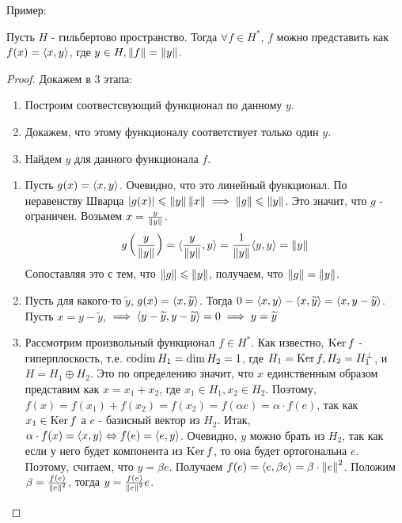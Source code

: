Пример: \todo

\begin{theorem}
	Пусть $H$ - гильбертово пространство. Тогда $\forall f \in H^*$, $f$ можно представить как $f(x) = \langle x , y\rangle$, где $y \in H, \left\|f\right\| = \left\|y\right\|$.
\end{theorem}
\begin{proof}
	Докажем в 3 этапа:
	\begin{enumerate}
		\item Построим соотвестсвующий функционал по данному $y$.
		\item Докажем, что этому функционалу соответствует только один $y$.
		\item Найдем $y$ для данного функционала $f$.
	\end{enumerate}
	\begin{enumerate}[leftmargin=*]
	\item
	Пусть $g(x) = \langle x , y\rangle$. Очевидно, что это линейный функционал. 
	По неравенству Шварца $\left|g(x)\right| \leqslant \left\|y\right\| \left\|x\right\| \implies \left\|g\right\| \leqslant \left\|y\right\|$. Это значит, что $g$ - ограничен.
	Возьмем $x = \frac{y}{\left\|y\right\|}$. 
	\begin{gather*}
		g\left(\frac{y}{\left\|y\right\|}\right) = \langle \frac{y}{\left\|y\right\|} , y\rangle = \frac{1}{\left\|y\right\|}\langle y , y\rangle = \left\|y\right\|
	\end{gather*}
	Сопоставляя это с тем, что $\left\|g\right\| \leqslant \left\|y\right\|$, получаем, что $\left\|g\right\| = \left\|y\right\|$.
	\item
	Пусть для какого-то $\widetilde{y}$, $g(x) = \langle x , \widetilde{y}\rangle$.
	Тогда $0 = \langle x , y\rangle - \langle x , \widetilde{y}\rangle = \langle x , y - \widetilde{y}\rangle$. Пусть $x = y - \widetilde{y}$,  
	$\implies \langle y - \widetilde{y} , y - \widetilde{y}\rangle = 0 \implies y = \widetilde{y}$
	\item
	Рассмотрим произвольный функционал $f \in H^*$. Как известно, $\operatorname{Ker} f$ - гиперплоскость, т.е. 
	$\operatorname{codim} H_1 = \dim H_2 = 1$, где $H_1 = \operatorname{Ker} f, H_2 = H_1^\bot$, и $H = H_1 \oplus H_2$.
	Это по определению значит, что $x$ единственным образом представим как $x = x_1 + x_2$, где $x_1 \in H_1, x_2 \in H_2$.
	Поэтому, $f(x) = f(x_1) + f(x_2) = f(x_2) = f(\alpha e) = \alpha \cdot f(e)$, так как $x_1 \in \operatorname{Ker} f$ а $e$ - базисный вектор из $H_2$.
	Итак, $\alpha \cdot f(x) = \langle x , y\rangle \Leftrightarrow f(e) = \langle e , y\rangle$. 
	Очевидно, $y$ можно брать из $H_2$, так как если у него будет компонента из $\operatorname{Ker} f$, то она будет ортогональна $e$. 
	Поэтому, считаем, что $y = \beta e$.
	Получаем $f(e) = \langle e , \beta e\rangle = \beta \cdot \left\|e\right\|^2$. Положим $\beta = \frac{f(e)}{\left\|e\right\|^2}$, тогда $y = \frac{f(e)}{\left\|e\right\|^2}e$.
	\end{enumerate}
\end{proof}


